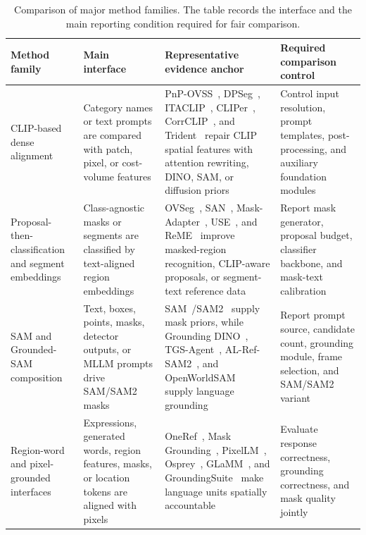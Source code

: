 \begin{table}[t]
\centering
\small
\setlength{\tabcolsep}{4pt}
\renewcommand{\arraystretch}{1.32}
\caption{Comparison of major method families. The table records the interface and the main reporting condition required for fair comparison.}
\label{tab:family-comparison}
\begin{tabularx}{\textwidth}{>{\raggedright\arraybackslash}p{}>{\raggedright\arraybackslash}p{}>{\raggedright\arraybackslash}p{}>{\raggedright\arraybackslash}X}
\toprule
Method family & Main interface & Representative evidence anchor & Required comparison control \\
\midrule
CLIP-based dense alignment & Category names or text prompts are compared with patch, pixel, or cost-volume features & PnP-OVSS~\citep{luo2024pnpovss}, DPSeg~\citep{zzhaoDPSegDualpromptCost2025}, ITACLIP~\citep{maaydinItaclipBoostingTrainingfree2025}, CLIPer~\citep{lsunCliperHierarchicallyImproving2025}, CorrCLIP~\citep{dzhangCorrclipReconstructingPatch2025}, and Trident~\citep{shiyHarnessingVisionFoundation2025} repair CLIP spatial features with attention rewriting, DINO, SAM, or diffusion priors & Control input resolution, prompt templates, post-processing, and auxiliary foundation modules \\
Proposal-then-classification and segment embeddings & Class-agnostic masks or segments are classified by text-aligned region embeddings & OVSeg~\citep{liang2023ovseg}, SAN~\citep{xu2023san}, Mask-Adapter~\citep{yliMaskadapterDevilMasks2025}, USE~\citep{xwangUseUniversalSegment2024}, and ReME~\citep{xxuanReMEDataCentricFramework2025} improve masked-region recognition, CLIP-aware proposals, or segment-text reference data & Report mask generator, proposal budget, classifier backbone, and mask-text calibration \\
SAM and Grounded-SAM composition & Text, boxes, points, masks, detector outputs, or MLLM prompts drive SAM/SAM2 masks & SAM~\citep{kirillov2023sam}/SAM2~\citep{ravi2024sam2} supply mask priors, while Grounding DINO~\citep{liu2024groundingdino}, TGS-Agent~\citep{zhouThinkYouSegment2026}, AL-Ref-SAM2~\citep{huangUnleashingTemporalspatialReasoning2025}, and OpenWorldSAM~\citep{sgxiaoOpenworldsamExtendingSam22026} supply language grounding & Report prompt source, candidate count, grounding module, frame selection, and SAM/SAM2 variant \\
Region-word and pixel-grounded interfaces & Expressions, generated words, region features, masks, or location tokens are aligned with pixels & OneRef~\citep{xiaoOnerefUnifiedOnetower2024}, Mask Grounding~\citep{chngMaskGroundingReferring2024}, PixelLM~\citep{renPixellmPixelReasoning2024}, Osprey~\citep{yuanOspreyPixelUnderstanding2024}, GLaMM~\citep{rasheedGlammPixelGrounding2024}, and GroundingSuite~\citep{huGroundingSuiteMeasuringComplex2025} make language units spatially accountable & Evaluate response correctness, grounding correctness, and mask quality jointly \\

\end{tabularx}
\end{table}
